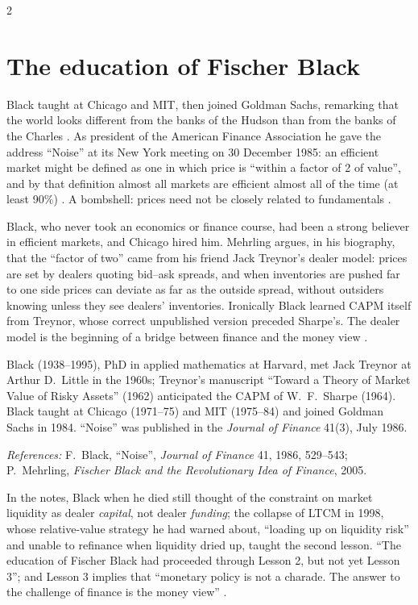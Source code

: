 \begin{paracol}{2}
\section{The education of Fischer Black}\label{sec:tv-education}

Black taught at Chicago and MIT, then joined Goldman Sachs, remarking that the world looks different from the banks of the Hudson than from the banks of the Charles
. As president of the American Finance Association he gave the address ``Noise'' at its New York meeting on 30 December 1985: an efficient market might be
defined as one in which price is ``within a factor of 2 of value'', and by that definition almost all markets are efficient almost all of the time (at least 90\%)
. A bombshell: prices need not be closely related to fundamentals .

\begin{intuition}
Black, who never took an economics or finance course, had been a strong believer in efficient markets, and Chicago hired him. Mehrling argues, in his biography, that the
``factor of two'' came from his friend Jack Treynor's dealer model: prices are set by dealers quoting bid--ask spreads, and when inventories are pushed far to one side prices can
deviate as far as the outside spread, without outsiders knowing unless they see dealers' inventories. Ironically Black learned CAPM itself from Treynor, whose correct
unpublished version preceded Sharpe's. The dealer model is the beginning of a bridge between finance and the money view .
\end{intuition}

\begin{history}
Black (1938--1995), PhD in applied mathematics at Harvard, met Jack Treynor at Arthur D.~Little in the 1960s; Treynor's manuscript ``Toward a Theory of Market Value of Risky Assets''
(1962) anticipated the CAPM of W.~F.~Sharpe (1964). Black taught at Chicago (1971--75) and MIT (1975--84) and joined Goldman Sachs in 1984. ``Noise'' was published in the
\emph{Journal of Finance} 41(3), July 1986.\par
\emph{References:} F.~Black, ``Noise'', \emph{Journal of Finance} 41, 1986, 529--543; P.~Mehrling, \emph{Fischer Black and the Revolutionary Idea of Finance}, 2005.
\end{history}

In the notes, Black when he died still thought of the constraint on market liquidity as dealer \emph{capital}, not dealer \emph{funding}; the collapse of LTCM in 1998, whose relative-value strategy
he had warned about, ``loading up on liquidity risk'' and unable to refinance when liquidity dried up, taught the second lesson. ``The education of Fischer Black had proceeded through Lesson 2,
but not yet Lesson 3''; and Lesson 3 implies that ``monetary policy is not a charade. The answer to the challenge of finance is the money view'' .


\end{paracol}
